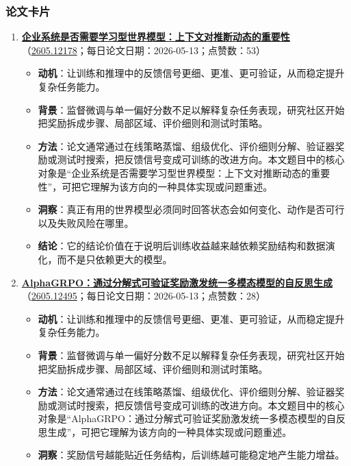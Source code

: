 \subsubsection{论文卡片}
\begin{enumerate}[leftmargin=1.5em]
  \item \textbf{\href{https://huggingface.co/papers/2605.12178}{企业系统是否需要学习型世界模型：上下文对推断动态的重要性}}（\href{https://arxiv.org/abs/2605.12178}{2605.12178}；每日论文日期：2026-05-13；点赞数：53）
  \begin{itemize}[leftmargin=1.5em]
    \item \textbf{动机}：让训练和推理中的反馈信号更细、更准、更可验证，从而稳定提升复杂任务能力。
    \item \textbf{背景}：监督微调与单一偏好分数不足以解释复杂任务表现，研究社区开始把奖励拆成步骤、局部区域、评价细则和测试时策略。
    \item \textbf{方法}：论文通常通过在线策略蒸馏、组级优化、评价细则分解、验证器奖励或测试时搜索，把反馈信号变成可训练的改进方向。本文题目中的核心对象是“企业系统是否需要学习型世界模型：上下文对推断动态的重要性”，可把它理解为该方向的一种具体实现或问题重述。
    \item \textbf{洞察}：真正有用的世界模型必须同时回答状态会如何变化、动作是否可行以及失败风险在哪里。
    \item \textbf{结论}：它的结论价值在于说明后训练收益越来越依赖奖励结构和数据演化，而不是只依赖更大的模型。
  \end{itemize}
  \item \textbf{\href{https://huggingface.co/papers/2605.12495}{AlphaGRPO：通过分解式可验证奖励激发统一多模态模型的自反思生成}}（\href{https://arxiv.org/abs/2605.12495}{2605.12495}；每日论文日期：2026-05-13；点赞数：28）
  \begin{itemize}[leftmargin=1.5em]
    \item \textbf{动机}：让训练和推理中的反馈信号更细、更准、更可验证，从而稳定提升复杂任务能力。
    \item \textbf{背景}：监督微调与单一偏好分数不足以解释复杂任务表现，研究社区开始把奖励拆成步骤、局部区域、评价细则和测试时策略。
    \item \textbf{方法}：论文通常通过在线策略蒸馏、组级优化、评价细则分解、验证器奖励或测试时搜索，把反馈信号变成可训练的改进方向。本文题目中的核心对象是“AlphaGRPO：通过分解式可验证奖励激发统一多模态模型的自反思生成”，可把它理解为该方向的一种具体实现或问题重述。
    \item \textbf{洞察}：奖励信号越能贴近任务结构，后训练越可能稳定地产生能力增益。

\end{itemize}
\end{enumerate}
